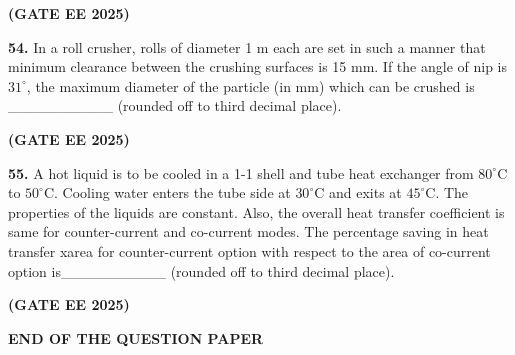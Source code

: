 \documentclass[journal,12pt,onecolumn]{IEEEtran}
\newcommand{\brak}[1]{(#1)}
\begin{document}
\hfill \textbf{\brak{GATE EE 2025}}

\noindent\textbf{54.} In a roll crusher, rolls of diameter 1 m each are set in such a manner that minimum clearance between the crushing surfaces is 15 mm. If the angle of nip is $31^{\circ}$, the maximum diameter of the particle \brak{in mm} which can be crushed is \_\_\_\_\_\_\_\_\_\_ \brak{rounded off to third decimal place}.

\hfill \textbf{\brak{GATE EE 2025}}

\noindent\textbf{55.} A hot liquid is to be cooled in a 1-1 shell and tube heat exchanger from $80^{\circ}\text{C}$ to $50^{\circ}\text{C}$. Cooling water enters the tube side at $30^{\circ}\text{C}$ and exits at $45^{\circ}\text{C}$. The properties of the liquids are constant. Also, the overall heat transfer coefficient is same for counter-current and co-current modes. The percentage saving in heat transfer xarea for counter-current option with respect to the area of co-current option is\_\_\_\_\_\_\_\_\_\_ \brak{rounded off to third decimal place}.

\hfill \textbf{\brak{GATE EE 2025}}

\begin{center}
\textbf{END OF THE QUESTION PAPER}
\end{center}
\end{document}

